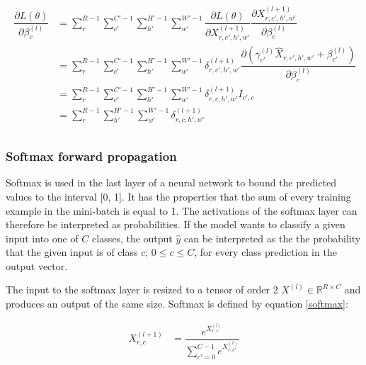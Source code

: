 \documentclass[a4paper,11pt,twoside]{article}
\newcommand*{\pd}[2]{\ensuremath{\dfrac{\partial #1}{\partial #2}}}
\begin{document}
\begin{align}
\begin{split}
	\pd{L(\theta)}{\beta^{(l)}_{c}}
		& = \sum^{R-1}_{r} \sum^{C'-1}_{c'} \sum^{H'-1}_{h'} \sum^{W'-1}_{w'} \pd{L(\theta)}{X^{(l+1)}_{r,c',h',w'}} \pd{X^{(l+1)}_{r,c',h',w'}}{\beta^{(l)}_{c}} \\
		& = \sum^{R-1}_{r} \sum^{C'-1}_{c'} \sum^{H'-1}_{h'} \sum^{W'-1}_{w'} \delta^{(l+1)}_{r,c',h',w'}  \pd{({\gamma_{c'}^{(l)} \hat{X}_{r,c',h',w'} + \beta_{c'}^{(l)}})}{\beta^{(l)}_{c}} \\
		& = \sum^{R-1}_{r} \sum^{C'-1}_{c'} \sum^{H'-1}_{h'} \sum^{W'-1}_{w'} \delta^{(l+1)}_{r,c,h',w'} I_{c',c}\\
		& = \sum^{R-1}_{r} \sum^{H'-1}_{h'} \sum^{W'-1}_{w'} \delta^{(l+1)}_{r,c,h',w'} \\
\end{split}
\end{align}

\subsubsection{Softmax forward propagation}
Softmax is used in the last layer of a neural network to bound the predicted values to the interval [0, 1]. It has the properties that the sum of every training example in the mini-batch is equal to 1. The activations of the softmax layer can therefore be interpreted as probabilities. If the model wants to classify a given input into one of $C$ classes, the output $\hat{y}$ can be interpreted as the the probability that the given input is of class $c$; $0 \leq c \leq C$, for every class prediction in the output vector. \cite{cs231n}

The input to the softmax layer is resized to a tensor of order 2 $X^{(l)} \in \mathbb{R}^{R \times C}$ and produces an output of the same size. Softmax is defined by equation \eqref{softmax}:

\begin{equation}\label{softmax}
\begin{split}
X^{(l+1)}_{r,c}
	& = \dfrac{e^{X^{(l)}_{r,c}}}{\sum^{C-1}_{c'=0}e^{X^{(l)}_{r,c'}}} \\
\end{split}
\end{equation}
\end{document}
